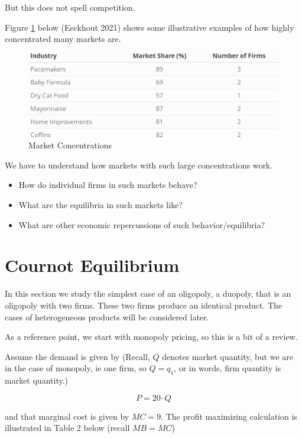 \documentclass[
]{book}
\providecommand{\tightlist}{%
  \setlength{\itemsep}{0pt}\setlength{\parskip}{0pt}}
\begin{document}
But this does not spell competition.

Figure \ref{fig:oligopoly1} below (Eeckhout 2021) shows some illustrative examples of how highly concentrated many markets are.

\begin{figure}

{\centering \includegraphics[width=0.8\linewidth]{img/oligopoly/gentable1} 

}

\caption{Market Concentrations}\label{fig:oligopoly1}
\end{figure}

We have to understand how markets with such large concentrations work.

\begin{itemize}
\tightlist
\item
  How do individual firms in such markets behave?
\item
  What are the equilibria in such markets like?
\item
  What are other economic repercussions of such behavior/equilibria?
\end{itemize}

\hypertarget{cournot-equilibrium}{%
\section{Cournot Equilibrium}\label{cournot-equilibrium}}

In this section we study the simplest case of an oligopoly, a duopoly, that is an oligopoly with two firms. These two firms produce an identical product. The cases of heterogeneous products will be considered later.

As a reference point, we start with monopoly pricing, so this is a bit of a review.

Assume the demand is given by (Recall, \(Q\) denotes market quantity, but we are in the case of monopoly, ie one firm, so \(Q=q_1\), or in words, firm quantity is market quantity.)

\[P = 20 – Q\]

and that marginal cost is given by \(MC = 9\). The profit maximizing calculation is illustrated in Table 2 below (recall \(MB=MC\))
\end{document}
